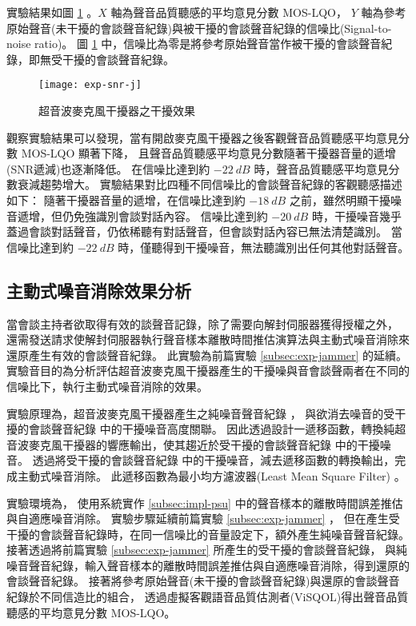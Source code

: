     實驗結果如圖 \ref{fig:exp-snr-j} 。$X$ 軸為聲音品質聽感的平均意見分數 MOS-LQO，
$Y$ 軸為參考原始聲音(未干擾的會談聲音紀錄)與被干擾的會談聲音紀錄的信噪比(Signal-to-noise ratio)。
圖 \ref{fig:exp-snr-j} 中，信噪比為零是將參考原始聲音當作被干擾的會談聲音紀錄，即無受干擾的會談聲音紀錄。

\begin{figure}[H]
    \centering
    \texttt{[image: exp-snr-j]}
    \caption{超音波麥克風干擾器之干擾效果}\label{fig:exp-snr-j}
\end{figure}

    觀察實驗結果可以發現，當有開啟麥克風干擾器之後客觀聲音品質聽感平均意見分數 MOS-LQO 顯著下降，
且聲音品質聽感平均意見分數隨著干擾器音量的遞增(SNR遞減)也逐漸降低。
在信噪比達到約 $-22~dB$ 時，聲音品質聽感平均意見分數衰減趨勢增大。
實驗結果對比四種不同信噪比的會談聲音紀錄的客觀聽感描述如下：
隨著干擾器音量的遞增，在信噪比達到約 $-18~dB$ 之前，雖然明顯干擾噪音遞增，但仍免強識別會談對話內容。
信噪比達到約 $-20~dB$ 時，干擾噪音幾乎蓋過會談對話聲音，仍依稀聽有對話聲音，但會談對話內容已無法清楚識別。
當信噪比達到約 $-22~dB$ 時，僅聽得到干擾噪音，無法聽識別出任何其他對話聲音。


\subsection{主動式噪音消除效果分析}\label{subsec:exp-snr-anc}

    當會談主持者欲取得有效的談聲音記錄，除了需要向解封伺服器獲得授權之外，
還需發送請求使解封伺服器執行聲音樣本離散時間推估演算法與主動式噪音消除來還原產生有效的會談聲音紀錄。
此實驗為前篇實驗 \ref{subsec:exp-jammer}  的延續。
實驗音目的為分析評估超音波麥克風干擾器產生的干擾噪與音會談聲兩者在不同的信噪比下，執行主動式噪音消除的效果。

    實驗原理為，超音波麥克風干擾器產生之純噪音聲音紀錄 \DEFrecN，
與欲消去噪音的受干擾的會談聲音紀錄 \DEFrecJ 中的干擾噪音高度關聯。
因此透過設計一遞移函數，轉換純超音波麥克風干擾器的響應輸出，使其趨近於受干擾的會談聲音紀錄 \DEFrecJ 中的干擾噪音。
透過將受干擾的會談聲音紀錄 \DEFrecJ 中的干擾噪音，減去遞移函數的轉換輸出，完成主動式噪音消除。
此遞移函數為最小均方濾波器(Least Mean Square Filter) \cite{widrow1975adaptive}。

    實驗環境為，
使用系統實作 \ref{subsec:impl-psu}  中的聲音樣本的離散時間誤差推估與自適應噪音消除。
實驗步驟延續前篇實驗 \ref{subsec:exp-jammer} ，
但在產生受干擾的會談聲音紀錄時，在同一信噪比的音量設定下，額外產生純噪音聲音紀錄。
接著透過將前篇實驗 \ref{subsec:exp-jammer}  所產生的受干擾的會談聲音紀錄，
與純噪音聲音紀錄，輸入聲音樣本的離散時間誤差推估與自適應噪音消除，得到還原的會談聲音紀錄。
接著將參考原始聲音(未干擾的會談聲音紀錄)與還原的會談聲音紀錄於不同信造比的組合，
透過虛擬客觀語音品質估測者(ViSQOL)得出聲音品質聽感的平均意見分數 MOS-LQO。

